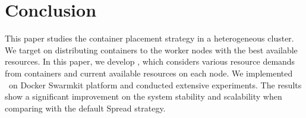 \section{Conclusion}
This paper studies the container placement strategy in a heterogeneous cluster.
We target on distributing containers to the worker nodes with the best available resources.
In this paper, we develop \sol, which considers various resource demands from containers and 
current available resources on each node. We implemented \sol~on Docker Swarmkit platform and 
conducted extensive experiments. 
The results show a significant improvement on the 
system stability and scalability when comparing with the default Spread strategy. 

